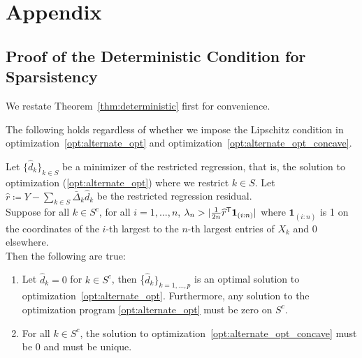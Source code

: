 \section{Appendix}
 
 
 \subsection{Proof of the Deterministic Condition for Sparsistency}
 \label{sec:deterministic_proof}
 
We restate Theorem~\ref{thm:deterministic} first for convenience. 
 
\begin{theorem} 
The following holds regardless of whether we impose the Lipschitz condition in optimization~\ref{opt:alternate_opt} and optimization~\ref{opt:alternate_opt_concave}.

Let $\{\hat{d}_k \}_{k \in S}$ be a minimizer of the restricted regression, that is, the solution to optimization (\ref{opt:alternate_opt}) where we restrict $k \in S$. 
Let $\hat{r} \coloneqq Y - \sum_{k \in S} \bar{\Delta}_k \hat{d}_k$ be the restricted regression residual. \\

Suppose for all $k\in S^c$, for all $i=1,...,n$, $\lambda_n > | \frac{1}{2n}
\widehat{r}^{\mathsf{T}} \mbox{\boldmath $1$}_{(i:n)}|$ where $\mathbf{1}_{(i:n)}$ is 1 on the coordinates of the $i$-th largest to the $n$-th largest entries of $X_k$ and 0 elsewhere.\\

Then the following are true:
\begin{enumerate}
\item Let $\hat{d}_k = 0$ for $k \in S^c$, then \{$\hat{d}_k\}_{k=1,...,p}$ is an optimal solution to optimization~\ref{opt:alternate_opt}. Furthermore, any solution to the optimization program \ref{opt:alternate_opt} must be zero on $S^c$.
\item For all $k \in S^c$, the solution to optimization~\ref{opt:alternate_opt_concave} must be 0 and must be unique.
\end{enumerate}
\end{theorem}


